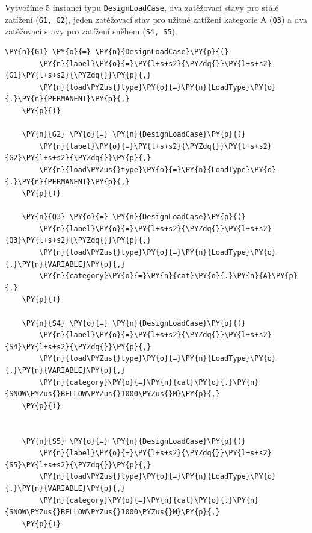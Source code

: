 Vytvoříme 5 instancí typu \texttt{DesignLoadCase}, dva zatěžovací stavy pro stálé zatížení (\texttt{G1, G2}), jeden zatěžovací stav pro užitné zatížení kategorie A (\texttt{Q3}) a dva zatěžovací stavy pro zatížení sněhem (\texttt{S4, S5}).
        \begin{tcolorbox}[breakable, size=fbox, boxrule=1pt, pad at break*=1mm,colback=cellbackground, colframe=cellborder]
    \begin{Verbatim}[commandchars=\\\{\}]
    \PY{n}{G1} \PY{o}{=} \PY{n}{DesignLoadCase}\PY{p}{(}
        \PY{n}{label}\PY{o}{=}\PY{l+s+s2}{\PYZdq{}}\PY{l+s+s2}{G1}\PY{l+s+s2}{\PYZdq{}}\PY{p}{,}
        \PY{n}{load\PYZus{}type}\PY{o}{=}\PY{n}{LoadType}\PY{o}{.}\PY{n}{PERMANENT}\PY{p}{,}
    \PY{p}{)}
    
    \PY{n}{G2} \PY{o}{=} \PY{n}{DesignLoadCase}\PY{p}{(}
        \PY{n}{label}\PY{o}{=}\PY{l+s+s2}{\PYZdq{}}\PY{l+s+s2}{G2}\PY{l+s+s2}{\PYZdq{}}\PY{p}{,}
        \PY{n}{load\PYZus{}type}\PY{o}{=}\PY{n}{LoadType}\PY{o}{.}\PY{n}{PERMANENT}\PY{p}{,}
    \PY{p}{)}
    
    \PY{n}{Q3} \PY{o}{=} \PY{n}{DesignLoadCase}\PY{p}{(}
        \PY{n}{label}\PY{o}{=}\PY{l+s+s2}{\PYZdq{}}\PY{l+s+s2}{Q3}\PY{l+s+s2}{\PYZdq{}}\PY{p}{,}
        \PY{n}{load\PYZus{}type}\PY{o}{=}\PY{n}{LoadType}\PY{o}{.}\PY{n}{VARIABLE}\PY{p}{,}
        \PY{n}{category}\PY{o}{=}\PY{n}{cat}\PY{o}{.}\PY{n}{A}\PY{p}{,}
    \PY{p}{)}
    
    \PY{n}{S4} \PY{o}{=} \PY{n}{DesignLoadCase}\PY{p}{(}
        \PY{n}{label}\PY{o}{=}\PY{l+s+s2}{\PYZdq{}}\PY{l+s+s2}{S4}\PY{l+s+s2}{\PYZdq{}}\PY{p}{,}
        \PY{n}{load\PYZus{}type}\PY{o}{=}\PY{n}{LoadType}\PY{o}{.}\PY{n}{VARIABLE}\PY{p}{,}
        \PY{n}{category}\PY{o}{=}\PY{n}{cat}\PY{o}{.}\PY{n}{SNOW\PYZus{}BELLOW\PYZus{}1000\PYZus{}M}\PY{p}{,}
    \PY{p}{)}
    
    
    \PY{n}{S5} \PY{o}{=} \PY{n}{DesignLoadCase}\PY{p}{(}
        \PY{n}{label}\PY{o}{=}\PY{l+s+s2}{\PYZdq{}}\PY{l+s+s2}{S5}\PY{l+s+s2}{\PYZdq{}}\PY{p}{,}
        \PY{n}{load\PYZus{}type}\PY{o}{=}\PY{n}{LoadType}\PY{o}{.}\PY{n}{VARIABLE}\PY{p}{,}
        \PY{n}{category}\PY{o}{=}\PY{n}{cat}\PY{o}{.}\PY{n}{SNOW\PYZus{}BELLOW\PYZus{}1000\PYZus{}M}\PY{p}{,}
    \PY{p}{)}
    \end{Verbatim}
    \end{tcolorbox}

